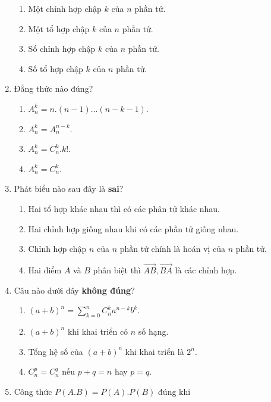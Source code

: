 \begin{enumerate}[label=\textbf{Câu \arabic*.},align=left,left=0cm..0cm,itemindent=*]
	\begin{enumerate}[label=\textbf{\Alph*.},align=left,left=1cm..0cm,itemindent=*]
		\item Một chỉnh hợp chập $k$ của $n$ phần tử.
		\item Một tổ hợp chập $k$ của $n$ phần tử.
		\item Số chỉnh hợp chập $k$ của $n$ phần tử.
		\item Số tổ hợp chập $k$ của $n$ phần tử.
	\end{enumerate}
	\item Đẳng thức nào đúng?
	\begin{enumerate}[label=\textbf{\Alph*.},align=left,left=1cm..0cm,itemindent=*]
		\item $A_n^k=n.\left( n-1 \right)...\left( n-k-1 \right)$.
		\item $A_n^k=A_{n}^{n-k}$.
		\item $A_n^k=C_{n}^{k}.k!$.
		\item $A_n^k=C_{n}^{k}$.
	\end{enumerate}
	\item Phát biểu nào sau đây là \textbf{sai}?
	\begin{enumerate}[label=\textbf{\Alph*.},align=left,left=1cm..0cm,itemindent=*]
		\item Hai tổ hợp khác nhau thì có các phân tử khác nhau.
		\item Hai chỉnh hợp giống nhau khi có các phần tử giống nhau.
		\item Chỉnh hợp chập $n$ của $n$ phần tử chính là hoán vị của $n$ phần tử.
		\item Hai điểm $A$ và $B$ phân biệt thì $\overrightarrow{AB},\overrightarrow{BA}$ là các chỉnh hợp.
	\end{enumerate}
	\item Câu nào dưới đây \textbf{không đúng}?
	\begin{enumerate}[label=\textbf{\Alph*.},align=left,left=1cm..0cm,itemindent=*]
		\item $(a+b)^n=\sum_{k=0}^nC_n^ka^{n-k}b^k$.
		\item $(a+b)^n$ khi khai triển có $n$ số hạng.
		\item Tổng hệ số của $(a+b)^n$ khi khai triển là $2^n$.
		\item $C_n^p=C_n^q$ nếu $p+q=n$ hay $p=q$.
	\end{enumerate}
	\item Công thức $P(A.B)=P(A).P(B)$ đúng khi
	\begin{enumerate}[label=\textbf{\Alph*.},align=left,left=1cm..0cm,itemindent=*]

\end{enumerate}
\end{enumerate}
